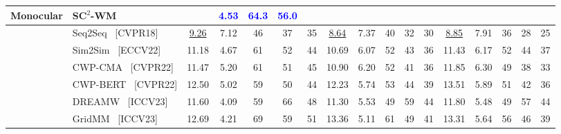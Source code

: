 \documentclass{article}
\theoremstyle{plain}
\theoremstyle{definition}
\theoremstyle{remark}
\begin{document}
\begin{table}[thpb]
{\begin{threeparttable}
\begin{tabular}{@{}c|l|ccccccccccccccc@{}}
   		\multicolumn{1}{c|}{\multirow{-8}{*}{\textbf{Monocular}}} & \cellcolor{gray!15}\textbf{SC$^2$-WM} & \multicolumn{1}{c}{\cellcolor{gray!15}{\textcolor{blue}{17.26}}} &  \multicolumn{1}{c}{\cellcolor{gray!15}\textcolor{blue}{4.53}} &  \multicolumn{1}{c}{\cellcolor{gray!15}\textcolor{blue}{64.3}} &  \multicolumn{1}{c}{\cellcolor{gray!15}\textcolor{blue}{56.0}} &  \multicolumn{1}{c|}{\cellcolor{gray!15}{\textcolor{blue}{41.9}}} & \multicolumn{1}{c}{\cellcolor{gray!15}{\textcolor{blue}{17.65}}} & \multicolumn{1}{c}{\cellcolor{gray!15}{\textcolor{blue}{5.37}}} & \multicolumn{1}{c}{\cellcolor{gray!15}{\textcolor{blue}{58.8}}} & \multicolumn{1}{c}{\cellcolor{gray!15}{\textcolor{blue}{50.9}}} & \multicolumn{1}{c|}{\cellcolor{gray!15}{\textcolor{blue}{37.2}}} & {\cellcolor{gray!15}{\textcolor{blue}{21.68}}} & \multicolumn{1}{c}{\cellcolor{gray!15}{\textcolor{blue}{6.04}}} & \multicolumn{1}{c}{\cellcolor{gray!15}{\textcolor{blue}{57.1}}} & \multicolumn{1}{c}{\cellcolor{gray!15}{\textcolor{blue}{47.0}}} & {\cellcolor{gray!15}{\textcolor{blue}{32.1}}}  \\
            \midrule[0.7pt]
			\multicolumn{1}{c|}{} 
			& Seq2Seq~\cite{anderson2018vision} {\scriptsize {\color{Gray} [CVPR18]} } & \underline{9.26} & 7.12 & 46 & 37 & \multicolumn{1}{c|}{35} & \underline{8.64} & 7.37 & 40 & 32 & \multicolumn{1}{c|}{30} & \underline {8.85} & 7.91 & 36 & 28 & 25 \\
			& Sim2Sim~\cite{Krantz2022Sim2SimTF} {\scriptsize {\color{Gray} [ECCV22]} }& 11.18 & 4.67 & 61 & 52 & \multicolumn{1}{c|}{44} & 10.69 & 6.07 & 52 & 43 & \multicolumn{1}{c|}{36} & 11.43 & 6.17 & 52 & 44 & 37 \\
			& CWP-CMA~\cite{Hong2022BridgingTG} {\scriptsize {\color{Gray} [CVPR22]}}& 11.47 & 5.20 & 61 & 51 & \multicolumn{1}{c|}{45} & 10.90 & 6.20 & 52 & 41 & \multicolumn{1}{c|}{36} & 11.85 & 6.30 & 49 & 38 & 33 \\
			& CWP-BERT~\cite{Hong2022BridgingTG}{\scriptsize {\color{Gray} [CVPR22]}}& 12.50 & 5.02 & 59 & 50 & \multicolumn{1}{c|}{44} & 12.23 & 5.74 & 53 & 44 & \multicolumn{1}{c|}{39} & 13.51 & 5.89 & 51 & 42 & 36 \\
			& DREAMW~\cite{Wang2023DREAMWALKERMP} {\scriptsize {\color{Gray} [ICCV23]}}& 11.60 & 4.09 & 59 & 66 & \multicolumn{1}{c|}{48} & 11.30 & 5.53 & 49 & {59} & \multicolumn{1}{c|}{44} & 11.80 & 5.48 & 49 & {57} & 44 \\
			& GridMM~\cite{wang2023gridmm} {\scriptsize {\color{Gray} [ICCV23]}}& 12.69 & 4.21 & 69 & 59 & \multicolumn{1}{c|}{51} & 13.36 & 5.11 & 61 & 49 & \multicolumn{1}{c|}{41} & 13.31 & 5.64 & 56 & 46 & 39 \\

\end{tabular}
\end{threeparttable}}
\end{table}
\end{document}
